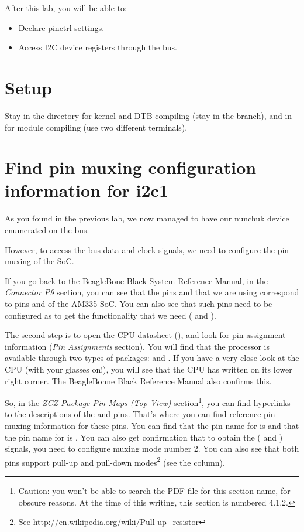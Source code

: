 
After this lab, you will be able to:

\begin{itemize}
\item Declare pinctrl settings.
\item Access I2C device registers through the bus.
\end{itemize}

\section{Setup}

Stay in the  directory for kernel and DTB
compiling (stay in the  branch), and in
 for module compiling
(use two different terminals).

\section{Find pin muxing configuration information for i2c1}

As you found in the previous lab, we now managed to have our nunchuk
device enumerated on the  bus.

However, to access the bus data and clock signals, we need to configure
the pin muxing of the SoC.

If you go back to the BeagleBone Black System Reference Manual, in the
{\em Connector P9} section, you can see that the pins  and
 that we are using correspond to pins  and 
of the AM335 SoC. You can also see that such pins need to be configured
as  to get the functionality that we need (
and ).

The second step is to open the CPU datasheet (), and
look for pin assignment information ({\em Pin Assignments} section).
You will find that the processor is available through two types of
packages:  and . If you have a very close look at the CPU
(with your glasses on!), you will see that the CPU has  written
on its lower right corner. The BeagleBonne Black Reference Manual also
confirms this.

So, in the {\em ZCZ Package Pin Maps (Top View)} section\footnote{Caution: you
won't be able to search the PDF file for this section name, for obscure
reasons. At the time of this writing, this section is numbered 4.1.2.}, you can find
hyperlinks to the descriptions of the  and  pins.
That's where you can find reference pin muxing information for these
pins.  You can find that the pin name for  is 
and that the pin name for  is .
You can also get confirmation that to obtain the ( and
) signals, you need to configure muxing mode number 2.
You can also see that both pins support pull-up and pull-down
modes\footnote{See \url{http://en.wikipedia.org/wiki/Pull-up_resistor}}
(see the  column).

